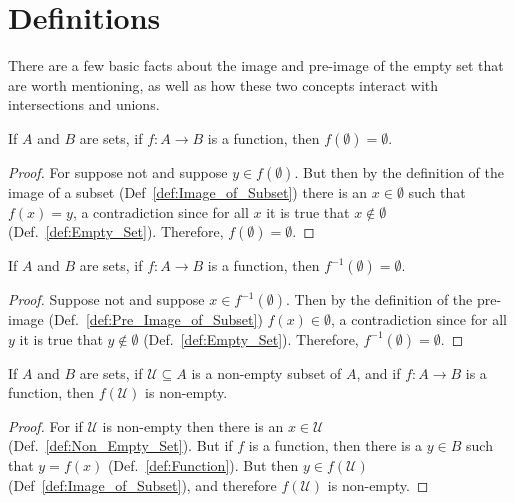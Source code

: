 \section{Definitions}
    There are a few basic facts about the image and pre-image of the empty set
    that are worth mentioning, as well as how these two concepts interact with
    intersections and unions.
    \begin{theorem}
        \label{thm:Image_of_Empty_Set_Is_Empty}%
        If $A$ and $B$ are sets, if $f:A\rightarrow{B}$ is a function,
        then $f(\emptyset)=\emptyset$.
    \end{theorem}
    \begin{proof}
        For suppose not and suppose $y\in{f}(\emptyset)$. But then by the
        definition of the image of a subset (Def~\ref{def:Image_of_Subset})
        there is an $x\in\emptyset$ such that $f(x)=y$, a contradiction since
        for all $x$ it is true that $x\notin\emptyset$
        (Def.~\ref{def:Empty_Set}). Therefore, $f(\emptyset)=\emptyset$.
    \end{proof}
    \begin{theorem}
        \label{thm:Pre_Image_of_Empty_Set_Is_Empty}%
        If $A$ and $B$ are sets, if $f:A\rightarrow{B}$ is a function, then
        $f^{\minus{1}}(\emptyset)=\emptyset$.
    \end{theorem}
    \begin{proof}
        Suppose not and suppose $x\in{f}^{\minus{1}}(\emptyset)$. Then by the
        definition of the pre-image (Def.~\ref{def:Pre_Image_of_Subset})
        $f(x)\in\emptyset$, a contradiction since for all $y$ it is true that
        $y\notin\emptyset$ (Def.~\ref{def:Empty_Set}). Therefore,
        $f^{\minus{1}}(\emptyset)=\emptyset$.
    \end{proof}
    \begin{theorem}
        \label{thm:Image_of_NonEmpty_Set_Is_NonEmpty}%
        If $A$ and $B$ are sets, if $\mathcal{U}\subseteq{A}$ is a non-empty
        subset of $A$, and if $f:A\rightarrow{B}$ is a function, then
        $f(\mathcal{U})$ is non-empty.
    \end{theorem}
    \begin{proof}
        For if $\mathcal{U}$ is non-empty then there is an $x\in\mathcal{U}$
        (Def.~\ref{def:Non_Empty_Set}). But if $f$ is a function, then there is
        a $y\in{B}$ such that $y=f(x)$ (Def.~\ref{def:Function}). But then
        $y\in{f}(\mathcal{U})$ (Def~\ref{def:Image_of_Subset}), and therefore
        $f(\mathcal{U})$ is non-empty.
    \end{proof}
